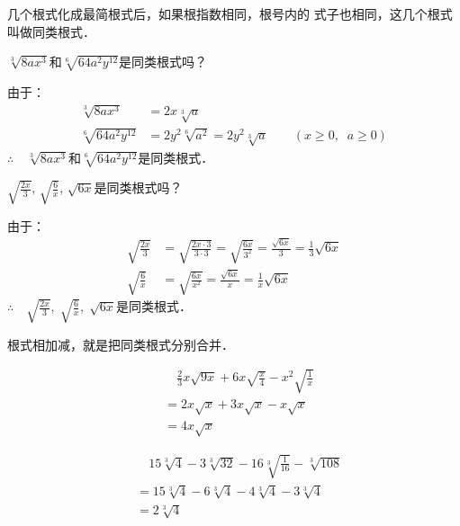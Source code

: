 几个根式化成最简根式后，如果根指数相同，根号内的
式子也相同，这几个根式叫做同类根式．


\begin{example}
    $\sqrt[3]{8ax^3}$和$\sqrt[6]{64a^2y^{12}}$是同类根式吗？
\end{example}
    
\begin{solution}
    由于：
\[\begin{split}
    \sqrt[3]{8ax^3}&=2x\sqrt[3]{a}\\
    \sqrt[6]{64a^2y^{12}}&=2y^2\sqrt[6]{a^2}=2y^2\sqrt[3]{a}\qquad (x\ge 0,\;\; a\ge 0)
\end{split}\]    
    $\therefore\quad \sqrt[3]{8ax^3}$和$\sqrt[6]{64a^2y^{12}}$是同类根式．
\end{solution}


\begin{example}
    $\sqrt{\frac{2x}{3}}$, $\sqrt{\frac{6}{x}}$, $\sqrt{6x}$是同类根式吗？
\end{example}


\begin{solution}
    由于：
\[\begin{split}
    \sqrt{\frac{2x}{3}}&=\sqrt{\frac{2x\cdot 3}{3\cdot 3}}=\sqrt{\frac{6x}{3^2}}=\frac{\sqrt{6x}}{3}=\frac{1}{3}\sqrt{6x} \\
    \sqrt{\frac{6}{x}}&= \sqrt{\frac{6x}{x^2}}=\frac{\sqrt{6x}}{x}=\frac{1}{x}\sqrt{6x}
\end{split}\]    
    $\therefore\quad \sqrt{\frac{2x}{3}},\; \sqrt{\frac{6}{x}},\;  \sqrt{6x}$是同类根式．
\end{solution}

根式相加减，就是把同类根式分别合并．


\begin{example}
    \[\begin{split}
       &\quad  \frac{2}{3}x\sqrt{9x}+6x\sqrt{\frac{x}{4}}-x^2\sqrt{\frac{1}{x}}\\
&=2x\sqrt{x}+3x\sqrt{x}-x\sqrt{x}\\
&=4x\sqrt{x}
    \end{split}\]
\end{example}
    
\begin{example}
    \[\begin{split}
        &\quad 15\sqrt[3]{4}-3\sqrt[3]{32}-16\sqrt[3]{\frac{1}{16}}-\sqrt[3]{108}\\
        &=15\sqrt[3]{4}-6\sqrt[3]{4}-4\sqrt[3]{4}-3\sqrt[3]{4}\\
        &=2\sqrt[3]{4}
    \end{split}\] 
\end{example}

